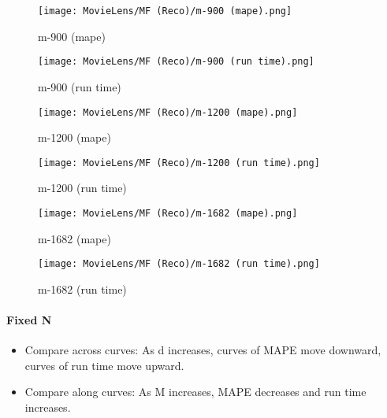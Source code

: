 \documentclass[12pt]{article}
\begin{document}
\begin{figure}[H]
\centering
    \begin{minipage}{0.45\textwidth}
        \centering
        \texttt{[image: MovieLens/MF (Reco)/m-900 (mape).png]}
        \caption{m-900 (mape)}
        
    \end{minipage}\hfill
    \begin{minipage}{0.45\textwidth}
        \centering
        \texttt{[image: MovieLens/MF (Reco)/m-900 (run time).png]}
        \caption{m-900 (run time)}
    \end{minipage}
\end{figure}

\begin{figure}[H]
\centering
    \begin{minipage}{0.45\textwidth}
        \centering
        \texttt{[image: MovieLens/MF (Reco)/m-1200 (mape).png]}
        \caption{m-1200 (mape)}
        
    \end{minipage}\hfill
    \begin{minipage}{0.45\textwidth}
        \centering
        \texttt{[image: MovieLens/MF (Reco)/m-1200 (run time).png]}
        \caption{m-1200 (run time)}
    \end{minipage}
\end{figure}

\begin{figure}[H]
\centering
    \begin{minipage}{0.45\textwidth}
        \centering
        \texttt{[image: MovieLens/MF (Reco)/m-1682 (mape).png]}
        \caption{m-1682 (mape)}
        
    \end{minipage}\hfill
    \begin{minipage}{0.45\textwidth}
        \centering
        \texttt{[image: MovieLens/MF (Reco)/m-1682 (run time).png]}
        \caption{m-1682 (run time)}
    \end{minipage}
\end{figure}

\paragraph{Fixed N}
\begin{itemize}
\item Compare across curves: As d increases, curves of MAPE move downward, curves of run time move upward.
\item Compare along curves: As M increases, MAPE decreases and run time increases. 
\end{itemize}
\end{document}
